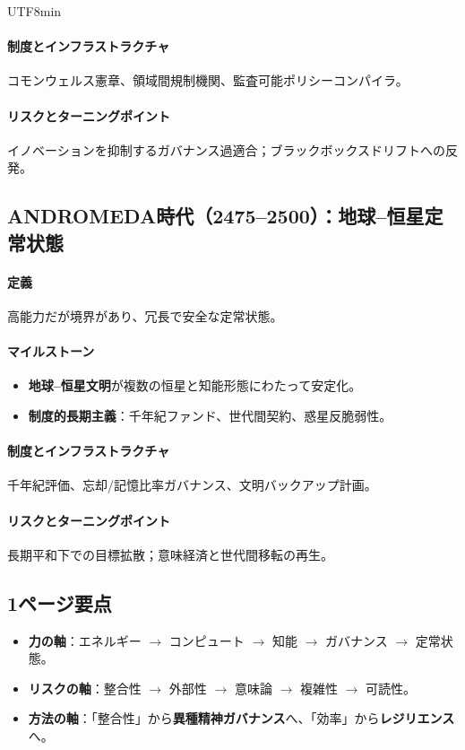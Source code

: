 \documentclass[11pt]{article}
\begin{document}
\begin{CJK}{UTF8}{min}
\begin{itemize}[noitemsep]
\paragraph{制度とインフラストラクチャ} コモンウェルス憲章、領域間規制機関、監査可能ポリシーコンパイラ。

\paragraph{リスクとターニングポイント} イノベーションを抑制するガバナンス過適合；ブラックボックスドリフトへの反発。

\subsection{ANDROMEDA時代（2475–2500）：地球–恒星定常状態}
\paragraph{定義} 高能力だが境界があり、冗長で安全な定常状態。

\paragraph{マイルストーン}
\begin{itemize}[noitemsep]
  \item \textbf{地球–恒星文明}が複数の恒星と知能形態にわたって安定化。
  \item \textbf{制度的長期主義}：千年紀ファンド、世代間契約、惑星反脆弱性。
\end{itemize}

\paragraph{制度とインフラストラクチャ} 千年紀評価、忘却/記憶比率ガバナンス、文明バックアップ計画。

\paragraph{リスクとターニングポイント} 長期平和下での目標拡散；意味経済と世代間移転の再生。

\subsection{1ページ要点}
\begin{itemize}[noitemsep]
  \item \textbf{力の軸}：エネルギー $\rightarrow$ コンピュート $\rightarrow$ 知能 $\rightarrow$ ガバナンス $\rightarrow$ 定常状態。
  \item \textbf{リスクの軸}：整合性 $\rightarrow$ 外部性 $\rightarrow$ 意味論 $\rightarrow$ 複雑性 $\rightarrow$ 可読性。
  \item \textbf{方法の軸}：「整合性」から\textbf{異種精神ガバナンス}へ、「効率」から\textbf{レジリエンス}へ。
\end{itemize}


\end{itemize}
\end{CJK}
\end{document}
